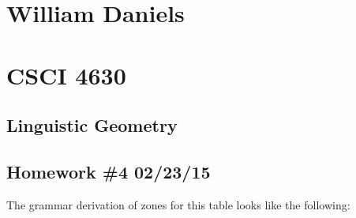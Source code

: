 \documentclass[11pt]{article}
\begin{document}
\begin{center}
\section*{William Daniels}
\section*{CSCI 4630}
\subsection*{Linguistic Geometry}
\subsection*{Homework \#4 02/23/15}
\end{center}

\vspace{.25cm}

The grammar derivation of zones for this table looks like the following: 
\end{document}
